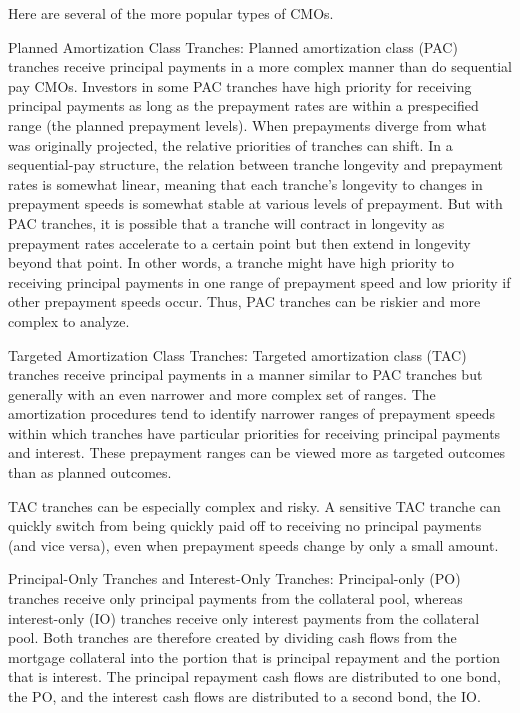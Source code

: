 \documentclass[11pt]{article}
\begin{document}
Here are several of the more popular types of CMOs.

Planned Amortization Class Tranches: Planned amortization class (PAC) tranches receive principal payments in a more complex manner than do sequential pay CMOs. Investors in some PAC tranches have high priority for receiving principal payments as long as the prepayment rates are within a prespecified range (the planned prepayment levels). When prepayments diverge from what was originally projected, the relative priorities of tranches can shift. In a sequential-pay structure, the relation between tranche longevity and prepayment rates is somewhat linear, meaning that each tranche's longevity to changes in prepayment speeds is somewhat stable at various levels of prepayment. But with PAC tranches, it is possible that a tranche will contract in longevity as prepayment rates accelerate to a certain point but then extend in longevity beyond that point. In other words, a tranche might have high priority to receiving principal payments in one range of prepayment speed and low priority if other prepayment speeds occur. Thus, PAC tranches can be riskier and more complex to analyze.

Targeted Amortization Class Tranches: Targeted amortization class (TAC) tranches receive principal payments in a manner similar to PAC tranches but generally with an even narrower and more complex set of ranges. The amortization procedures tend to identify narrower ranges of prepayment speeds within which tranches have particular priorities for receiving principal payments and interest. These prepayment ranges can be viewed more as targeted outcomes than as planned outcomes.

TAC tranches can be especially complex and risky. A sensitive TAC tranche can quickly switch from being quickly paid off to receiving no principal payments (and vice versa), even when prepayment speeds change by only a small amount.

Principal-Only Tranches and Interest-Only Tranches: Principal-only (PO) tranches receive only principal payments from the collateral pool, whereas interest-only (IO) tranches receive only interest payments from the collateral pool. Both tranches are therefore created by dividing cash flows from the mortgage collateral into the portion that is principal repayment and the portion that is interest. The principal repayment cash flows are distributed to one bond, the PO, and the interest cash flows are distributed to a second bond, the IO.
\end{document}
